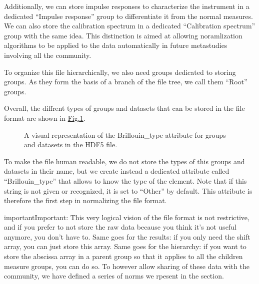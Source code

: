 \documentclass[letterpaper,10pt,english]{sphinxmanual}
\begin{document}
\sphinxAtStartPar
Additionally, we can store impulse responses to characterize the instrument in a dedicated “Impulse response” group to differentiate it from the normal measures. We can also store the calibration spectrum in a dedicated “Calibration spectrum” group with the same idea. This distinction is aimed at allowing noramlization algorithms to be applied to the data automatically in future meta\sphinxhyphen{}studies involving all the community.

\sphinxAtStartPar
To organize this file hierarchically, we also need groups dedicated to storing groups. As they form the basis of a branch of the file tree, we call them “Root” groups.

\sphinxAtStartPar
Overall, the diffrent types of groups and datasets that can be stored in the file format are shown in \hyperref[\detokenize{source/project_nutshell:groups-and-datasets-type}]{Fig.\@ \ref{\detokenize{source/project_nutshell:groups-and-datasets-type}}}.

\begin{figure}[htbp]
\centering
\capstart

\noindent{}
\caption{A visual representation of the Brillouin\_type attribute for groups and datasets in the HDF5 file.}\label{\detokenize{source/project_nutshell:id2}}\label{\detokenize{source/project_nutshell:groups-and-datasets-type}}\end{figure}

\sphinxAtStartPar
To make the file human readable, we do not store the types of this groups and datasets in their name, but we create instead a dedicated attribute called “Brillouin\_type” that allows to know the type of the element. Note that if this string is not given or recognized, it is set to “Other” by default. This attribute is therefore the first step in normalizing the file format.

\begin{sphinxadmonition}{important}{Important:}
\sphinxAtStartPar
This very logical vision of the file format is not restrictive, and if you prefer to not store the raw data because you think it’s not useful anymore, you don’t have to. Same goes for the results: if you only need the shift array, you can just store this array. Same goes for the hierarchy: if you want to store the abscissa array in a parent group so that it applies to all the children measure groups, you can do so. To however allow sharing of these data with the community, we have defined a series of norms we rpesent in the {\hyperref[\detokenize{source/normalization:normalization}]{}} section.
\end{sphinxadmonition}
\end{document}
